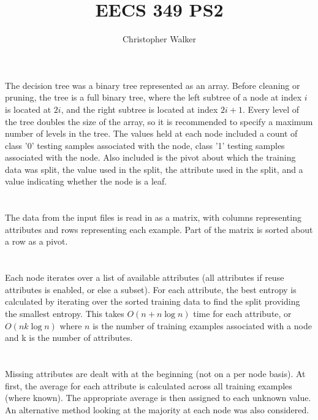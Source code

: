 \documentclass[11pt]{article}
\title{EECS 349 PS2}
\author{Christopher Walker}
\begin{document}
\maketitle

\section{}

The decision tree was a binary tree represented as an array. Before cleaning or pruning, the tree is a full binary tree, where the left subtree of a node at index $i$ is located at $2i$, and the right subtree is located at index $2i + 1$. Every level of the tree doubles the size of the array, so it is recommended to specify a maximum number of levels in the tree. The values held at each node included a count of class '0' testing samples associated with the node, class '1' testing samples associated with the node. Also included is the pivot about which the training data was split, the value used in the split, the attribute used in the split, and a value indicating whether the node is a leaf.

\section{}

The data from the input files is read in as a matrix, with columns representing attributes and rows representing each example. Part of the matrix is sorted about a row as a pivot.

\section{}

Each node iterates over a list of available attributes (all attributes if reuse attributes is enabled, or else a subset). For each attribute, the best entropy is calculated by iterating over the sorted training data to find the split providing the smallest entropy. This takes $O(n + n \log n)$ time for each attribute, or $O(n k \log n)$ where $n$ is the number of training examples associated with a node and k is the number of attributes.

\section{}

Missing attributes are dealt with at the beginning (not on a per node basis). At first, the average for each attribute is calculated across all training examples (where known). The appropriate average is then assigned to each unknown value. An alternative method looking at the majority at each node was also considered.
\end{document}
